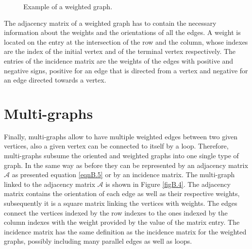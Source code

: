 \begin{figure}[!htbp]
\centering
{}
\caption{Example of a weighted graph.}
\label{figB.3}
\end{figure}

The adjacency matrix of a weighted graph has to contain the necessary information about the weights and the orientations of all the edges. A weight is located on the entry at the intersection of the row and the column, whose indexes are the index of the initial vertex and of the terminal vertex respectively. The entries of the incidence matrix are the weights of the edges with positive and negative signs, positive for an edge that is directed from a vertex and negative for an edge directed towards a vertex.

\section{Multi-graphs}

Finally, multi-graphs allow to have multiple weighted edges between two given vertices, also a given vertex can be connected to itself by a loop. Therefore, multi-graphs subsume the oriented and weighted graphs into one single type of graph. In the same way as before they can be represented by an adjacency matrix $\mathcal{A}$ as presented equation \eqref{eqnB.5} or by an incidence matrix. The multi-graph linked to the adjacency matrix $\mathcal{A}$ is shown in Figure \ref{figB.4}. The adjacency matrix contains the orientation of each edge as well as their respective weights, subsequently it is a square matrix linking the vertices with weights. The edges connect the vertices indexed by the row indexes to the ones indexed by the column indexes with the weight provided by the value of the matrix entry. The incidence matrix has the same definition as the incidence matrix for the weighted graphs, possibly including many parallel edges as well as loops.


